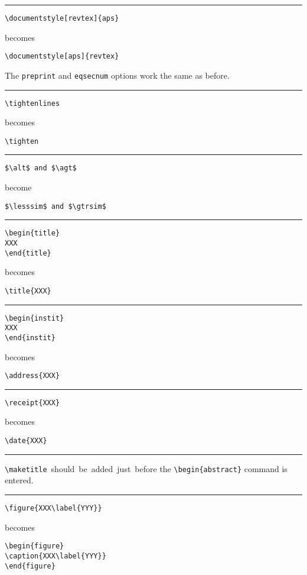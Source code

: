 \smallskip
  \hrule \nobreak\smallskip
\begin{verbatim}
\documentstyle[revtex]{aps}
\end{verbatim}
  becomes
\begin{verbatim}
\documentstyle[aps]{revtex}
\end{verbatim}
The \verb+preprint+ and \verb+eqsecnum+ options work the same as before.
\smallskip \hrule \nobreak\smallskip
\begin{verbatim}
\tightenlines
\end{verbatim}
  becomes
\begin{verbatim}
\tighten
\end{verbatim}
\smallskip \hrule \nobreak\smallskip
\begin{verbatim}
$\alt$ and $\agt$
\end{verbatim}
  become
\begin{verbatim}
$\lesssim$ and $\gtrsim$
\end{verbatim}
  \smallskip \hrule  \smallskip
\begin{verbatim}
\begin{title}
XXX
\end{title}
\end{verbatim}
  becomes
\begin{verbatim}
\title{XXX}
\end{verbatim}
  \smallskip \hrule  \smallskip
\begin{verbatim}
\begin{instit}
XXX
\end{instit}
\end{verbatim}
  becomes
\begin{verbatim}
\address{XXX}
\end{verbatim}
  \smallskip \hrule  \smallskip
\begin{verbatim}
\receipt{XXX}
\end{verbatim}
  becomes
\begin{verbatim}
\date{XXX}
\end{verbatim}
  \smallskip \hrule  \smallskip
  \verb+\maketitle+~should~be~added~just~before the \verb+\begin{abstract}+
  command is entered.
  \smallskip \hrule  \smallskip
\begin{verbatim}
\figure{XXX\label{YYY}}
\end{verbatim}
  becomes
\begin{verbatim}
\begin{figure}
\caption{XXX\label{YYY}}
\end{figure}
\end{verbatim}
